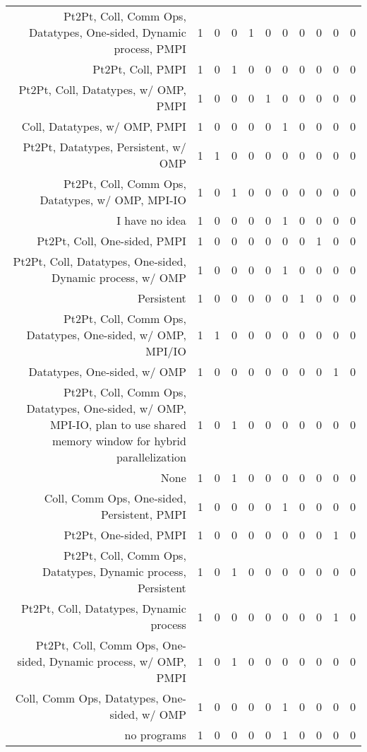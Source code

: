 {\begin{landscape}
\begin{longtable}[htb]{r|c|c|c|c|c|c|c|c|c|c}
{Pt2Pt, Coll, Comm Ops, Datatypes, One-sided, Dynamic process, PMPI} & 1 & 0 & 0 & 1 & 0 & 0 & 0 & 0 & 0 & 0 \\%
{Pt2Pt, Coll, PMPI} & 1 & 0 & 1 & 0 & 0 & 0 & 0 & 0 & 0 & 0 \\%
{Pt2Pt, Coll, Datatypes, w/ OMP, PMPI} & 1 & 0 & 0 & 0 & 1 & 0 & 0 & 0 & 0 & 0 \\%
{Coll, Datatypes, w/ OMP, PMPI} & 1 & 0 & 0 & 0 & 0 & 1 & 0 & 0 & 0 & 0 \\%
{Pt2Pt, Datatypes, Persistent, w/ OMP} & 1 & 1 & 0 & 0 & 0 & 0 & 0 & 0 & 0 & 0 \\%
{Pt2Pt, Coll, Comm Ops, Datatypes, w/ OMP, MPI-IO} & 1 & 0 & 1 & 0 & 0 & 0 & 0 & 0 & 0 & 0 \\%
{I have no idea} & 1 & 0 & 0 & 0 & 0 & 1 & 0 & 0 & 0 & 0 \\%
{Pt2Pt, Coll, One-sided, PMPI} & 1 & 0 & 0 & 0 & 0 & 0 & 0 & 1 & 0 & 0 \\%
{Pt2Pt, Coll, Datatypes, One-sided, Dynamic process, w/ OMP} & 1 & 0 & 0 & 0 & 0 & 1 & 0 & 0 & 0 & 0 \\%
{Persistent} & 1 & 0 & 0 & 0 & 0 & 0 & 1 & 0 & 0 & 0 \\%
{Pt2Pt, Coll, Comm Ops, Datatypes, One-sided, w/ OMP, MPI/IO} & 1 & 1 & 0 & 0 & 0 & 0 & 0 & 0 & 0 & 0 \\%
{Datatypes, One-sided, w/ OMP} & 1 & 0 & 0 & 0 & 0 & 0 & 0 & 0 & 1 & 0 \\%
{Pt2Pt, Coll, Comm Ops, Datatypes, One-sided, w/ OMP, MPI-IO, plan to use shared memory window for hybrid parallelization} & 1 & 0 & 1 & 0 & 0 & 0 & 0 & 0 & 0 & 0 \\%
{None} & 1 & 0 & 1 & 0 & 0 & 0 & 0 & 0 & 0 & 0 \\%
{Coll, Comm Ops, One-sided, Persistent, PMPI} & 1 & 0 & 0 & 0 & 0 & 1 & 0 & 0 & 0 & 0 \\%
{Pt2Pt, One-sided, PMPI} & 1 & 0 & 0 & 0 & 0 & 0 & 0 & 0 & 1 & 0 \\%
{Pt2Pt, Coll, Comm Ops, Datatypes, Dynamic process, Persistent} & 1 & 0 & 1 & 0 & 0 & 0 & 0 & 0 & 0 & 0 \\%
{Pt2Pt, Coll, Datatypes, Dynamic process} & 1 & 0 & 0 & 0 & 0 & 0 & 0 & 0 & 1 & 0 \\%
{Pt2Pt, Coll, Comm Ops, One-sided, Dynamic process, w/ OMP, PMPI} & 1 & 0 & 1 & 0 & 0 & 0 & 0 & 0 & 0 & 0 \\%
{Coll, Comm Ops, Datatypes, One-sided, w/ OMP} & 1 & 0 & 0 & 0 & 0 & 1 & 0 & 0 & 0 & 0 \\%
{no programs} & 1 & 0 & 0 & 0 & 0 & 1 & 0 & 0 & 0 & 0 \\%

\end{longtable}
\end{landscape}}
